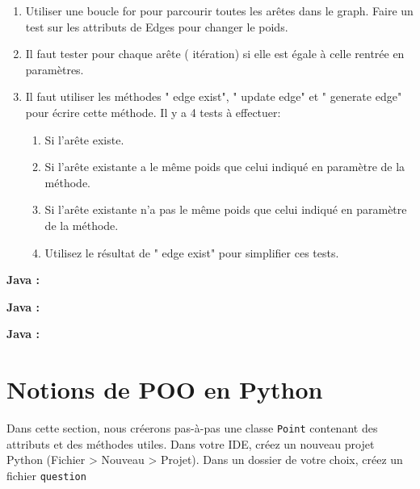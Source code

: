 \begin{Exercice}[20 minutes]
    \begin{conseil}
    \begin{enumerate}
    \item Utiliser une boucle for pour parcourir toutes les arêtes dans le graph. Faire un test sur les attributs de Edges pour changer le poids.
    \item Il faut tester pour chaque arête ( itération) si elle  est égale à celle rentrée en paramètres.
    \item Il faut utiliser les méthodes " edge exist", " update edge" et " generate edge" pour écrire cette méthode. Il y a 4 tests à effectuer: 
        \begin{enumerate}
        \item Si l'arête existe.
        \item Si l'arête existante a le même poids que celui indiqué en paramètre de la méthode.
        \item Si l'arête existante n'a pas le même poids que celui indiqué en paramètre de la méthode.
        \item Utilisez le résultat de " edge exist" pour simplifier ces tests.
        \end{enumerate}
    \end{enumerate}
    \end{conseil}
    \begin{solution}
    \textbf{Java :}
         
    \end{solution}
    \begin{solution}
    \textbf{Java :}
         
    \end{solution}
    \begin{solution}
    \textbf{Java :}
         
    \end{solution}

\end{Exercice}


\section{Notions de POO en Python}
Dans cette section, nous créerons pas-à-pas une classe \lstinline{Point} contenant des attributs et des méthodes utiles.
Dans votre IDE, créez un nouveau projet Python (Fichier > Nouveau > Projet). Dans un dossier de votre choix, créez un fichier \lstinline{question} %

